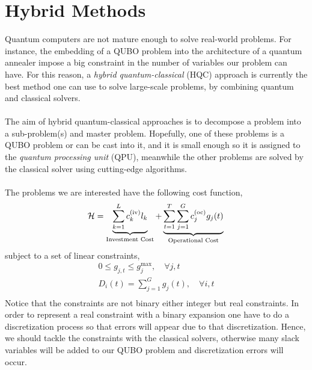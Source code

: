 
\chapter{Hybrid Methods} %

\label{Chapter3} %
Quantum computers are not mature enough to solve real-world problems. For instance, the embedding of a QUBO problem into the architecture of a quantum annealer impose a big constraint in the number of variables our problem can have. For this reason, a \textit{hybrid quantum-classical} (HQC) approach is currently the best method one can use to solve large-scale problems, by combining quantum and classical solvers.\\\\
The aim of hybrid quantum-classical approaches is to decompose a problem into a sub-problem(s) and master problem. Hopefully, one of these problems is a QUBO problem or can be cast into it, and it is small enough so it is assigned to the \textit{quantum processing unit} (QPU), meanwhile the other problems are solved by the classical solver using cutting-edge algorithms. \\\\
The problems we are interested have the following cost function,
\begin{equation}
    \mathcal{H} = \underbrace{\sum_{k=1}^{L}c_{k}^{(\text{iv})}l_{k}}_{\text{Investment Cost}} + \underbrace{\sum_{t=1}^{T}\sum_{j=1}^{G}c_{j}^{(\text{oc})}g_{j}(t)}_{\text{Operational Cost}}\\ 
\end{equation}
subject to a set of linear constraints,
\begin{align}
    0 \leq g_{j,t}\leq g_{j}^{\max},\quad \forall j,t \\
    D_{i}(t) =\sum_{j=1}^{G}g_{j}(t), \quad \forall i,t \\
\end{align}
Notice that the constraints are not binary either integer but real constraints. In order to represent a real constraint with a binary expansion one have to do a discretization process so that errors will appear due to that discretization. Hence, we should tackle the constraints with the classical solvers, otherwise many slack variables will be added to our QUBO problem and discretization errors will occur.
